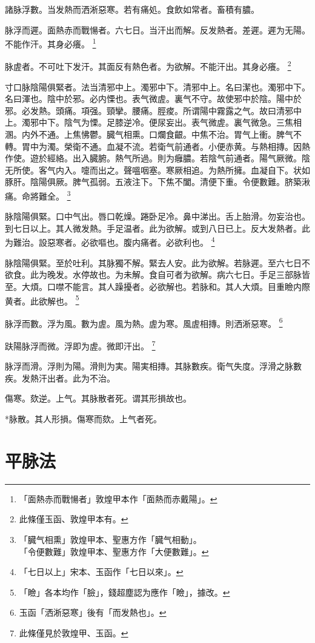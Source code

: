 \documentclass[b5paper,twoside,zihao=-4,UTF8]{ctexbook}
\begin{document}
諸脉浮數。当发熱而洒淅惡寒。若有痛処。食飲如常者。畜積有膿。

脉浮而遲。面熱赤而戰愓者。六七日。当汗出而解。反发熱者。差遲。遲为无陽。不能作汗。其身必癢。
	\footnote{「面熱赤而戰愓者」敦煌甲本作「面熱而赤戴陽」。}

脉虗者。不可吐下发汗。其面反有熱色者。为欲解。不能汗出。其身必癢。
	\footnote{此條僅玉函、敦煌甲本有。}

寸口脉陰陽俱緊者。法当清邪中上。濁邪中下。清邪中上。名曰潔也。濁邪中下。名曰渾也。陰中於邪。必内慄也。表气微虗。裏气不守。故使邪中於陰。陽中於邪。必发熱。頭痛。項强。頸攣。腰痛。脛痠。所谓陽中霧露之气。故曰清邪中上。濁邪中下。陰气为慄。足膝逆冷。便尿妄出。表气微虗。裏气微急。三焦相溷。内外不通。上焦怫鬱。臓气相熏。口爛食齦。中焦不治。胃气上衝。脾气不轉。胃中为濁。榮衛不通。血凝不流。若衛气前通者。小便赤黄。与熱相摶。因熱作使。遊於經絡。出入臓腑。熱气所過。則为癰膿。若陰气前通者。陽气厥微。陰无所使。客气内入。嚏而出之。聲嗢咽塞。寒厥相追。为熱所擁。血凝自下。状如豚肝。陰陽俱厥。脾气孤弱。五液注下。下焦不闔。清便下重。令便數難。脐築湫痛。命將難全。
	\footnote{「臓气相熏」敦煌甲本、聖惠方作「臓气相動」。\\「令便數難」敦煌甲本、聖惠方作「大便數難」。}

脉陰陽俱緊。口中气出。唇口乾燥。踡卧足冷。鼻中涕出。舌上胎滑。勿妄治也。到七日以上。其人微发熱。手足温者。此为欲解。或到八日已上。反大发熱者。此为難治。設惡寒者。必欲嘔也。腹内痛者。必欲利也。
	\footnote{「七日以上」宋本、玉函作「七日以來」。}

脉陰陽俱緊。至於吐利。其脉獨不解。緊去人安。此为欲解。若脉遲。至六七日不欲食。此为晚发。水停故也。为未解。食自可者为欲解。病六七日。手足三部脉皆至。大煩。口噤不能言。其人躁擾者。必欲解也。若脉和。其人大煩。目重瞼内際黄者。此欲解也。
	\footnote{「瞼」各本均作「臉」，錢超塵認为應作「瞼」，據改。}

脉浮而數。浮为風。數为虗。風为熱。虗为寒。風虗相摶。則洒淅惡寒。
	\footnote{玉函「洒淅惡寒」後有「而发熱也」。}

趺陽脉浮而微。浮即为虗。微即汗出。
	\footnote{此條僅見於敦煌甲、玉函。}

脉浮而滑。浮{則}为陽。滑{則}为実。陽実相摶。其脉數疾。衛气失度。浮滑之脉數疾。发熱汗出者。此为不治。

傷寒。欬逆。上气。其脉散者死。谓其形損故也。

*脉散。其人形損。傷寒而欬。上气者死。

\chapter{平脉法}
\end{document}
